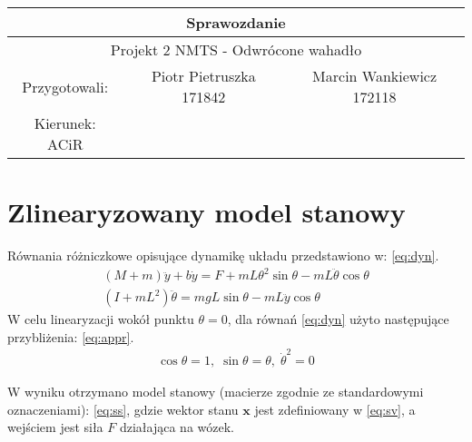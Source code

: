 \documentclass{article}
\begin{document}
\begin{tabular}{|c|c|c|}
\hline 
\multicolumn{3}{|c|}{\huge Sprawozdanie } \\ 
\hline 
\multicolumn{3}{|c|}{\LARGE Projekt 2 NMTS - Odwrócone wahadło} \\ 
\hline 
\Large Przygotowali: &\Large Piotr Pietruszka 171842 &\Large Marcin Wankiewicz 172118  \\ 
\hline 
\Large Kierunek: ACiR  \\ 
\hline 
 
\end{tabular} 

\section{Zlinearyzowany model stanowy}

Równania różniczkowe opisujące dynamikę układu przedstawiono w: \ref{eq:dyn}.
\begin{equation}\label{eq:dyn}
 \begin{array}{l}
  (M+m) \ddot{y} + b\dot{y} = F + mL\theta^2 \sin\theta - mL\ddot{\theta}\cos\theta \\
  (I + mL^2)\ddot{\theta} = mgL\sin\theta - mL\ddot{y}\cos\theta
 \end{array}
\end{equation}
W celu linearyzacji wokół punktu $\theta=0$, dla równań \ref{eq:dyn} użyto następujące przybliżenia: \ref{eq:appr}.
\begin{equation}\label{eq:appr}
 \begin{array}{l}
  \cos\theta = 1,\;  \sin\theta=\theta, \; \dot{\theta}^2 = 0
 \end{array}
\end{equation}

W wyniku otrzymano model stanowy (macierze zgodnie ze standardowymi oznaczeniami): \ref{eq:ss}, gdzie wektor stanu $\textbf{x}$ jest zdefiniowany w \ref{eq:sv}, a wejściem jest siła $F$ działająca na wózek.
\end{document}

